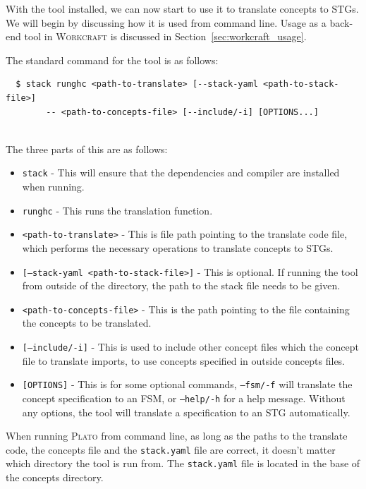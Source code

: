 \documentclass[british,technote,compsoc]{IEEEtran}
\newcommand{\noun}[1]{\textsc{#1}}
\begin{document}
With the tool installed, we can now start to use it to translate concepts to STGs. We will begin by discussing how it is used from command line. Usage as a back-end tool in 
\noun{Workcraft} is discussed in Section~\ref{sec:workcraft_usage}.

The standard command for the tool is as follows:

\begin{verbatim}
  $ stack runghc <path-to-translate> [--stack-yaml <path-to-stack-file>] 
  		-- <path-to-concepts-file> [--include/-i] [OPTIONS...]
                                           
\end{verbatim}

The three parts of this are as follows:
\begin{itemize}
  \item \texttt{stack} - This will ensure that the dependencies and compiler are installed when running.
  \item \texttt{runghc} - This runs the translation function.
  \item \texttt{<path-to-translate>} - This is file path pointing to the translate code file, which performs the necessary operations to translate concepts to STGs.
  \item \texttt{[--stack-yaml <path-to-stack-file>]} - This is optional. If running the tool from outside of the directory, the path to the stack file needs to be given.
  \item \texttt{<path-to-concepts-file>} - This is the path pointing to the file containing the concepts to be translated.
  \item \texttt{[--include/-i]} - This is used to include other concept files which the concept file to translate imports, to use concepts specified in outside concepts files.
  \item \texttt{[OPTIONS]} - This is for some optional commands, \texttt{--fsm/-f} will translate the concept specification to an FSM, or \texttt{--help/-h} for a help message. Without any 
  				   options, the tool will translate a specification to an STG automatically. 
\end{itemize}

When running \noun{Plato} from command line, as long as the paths to the translate code, the concepts
file and the \texttt{stack.yaml} file are correct, it doesn't matter which directory the tool is run from.  The \texttt{stack.yaml} file is located in the base of the concepts directory.
\end{document}
